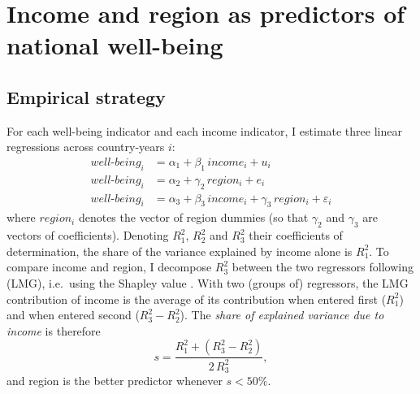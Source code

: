 \documentclass[12pt]{article}
\begin{document}
\section{Income and region as predictors of national well-being}\label{sec:region}
\subsection{Empirical strategy}\label{subsec:method_region}

For each well-being indicator and each income indicator, I estimate three linear regressions across country-years $i$:
\begin{align}
    well\text{-}being_i &= \alpha_1 + \beta_1\, income_i + u_i \label{eq:income}\\
    well\text{-}being_i &= \alpha_2 + \gamma_2\, region_i + e_i \label{eq:region}\\
    well\text{-}being_i &= \alpha_3 + \beta_3\, income_i + \gamma_3\, region_i + \varepsilon_i \label{eq:both}
\end{align}
where $region_i$ denotes the vector of region dummies (so that $\gamma_2$ and $\gamma_3$ are vectors of coefficients). Denoting $R^2_1$, $R^2_2$ and $R^2_3$ their coefficients of determination, the share of the variance explained by income alone is $R^2_1$. To compare income and region, I decompose $R^2_3$ between the two regressors following \citet{lindeman_introduction_1980} (LMG), i.e.\ using the Shapley value \citep{gromping_estimators_2007}. With two (groups of) regressors, the LMG contribution of income is the average of its contribution when entered first ($R^2_1$) and when entered second ($R^2_3 - R^2_2$). The \textit{share of explained variance due to income} is therefore
\begin{equation}
    s = \frac{R^2_1 + (R^2_3 - R^2_2)}{2\, R^2_3}, \label{eq:share}
\end{equation}
and region is the better predictor whenever $s < 50\%$.
\end{document}
